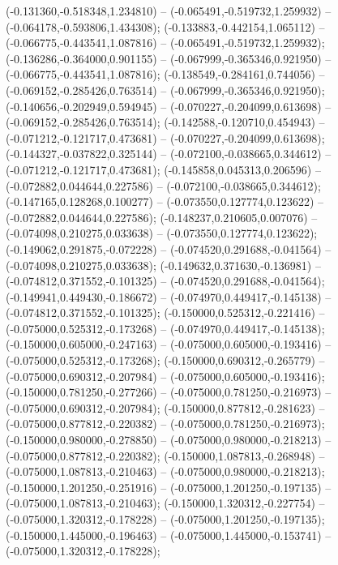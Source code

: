  (-0.131360,-0.518348,1.234810) -- (-0.065491,-0.519732,1.259932) -- (-0.064178,-0.593806,1.434308);
 (-0.133883,-0.442154,1.065112) -- (-0.066775,-0.443541,1.087816) -- (-0.065491,-0.519732,1.259932);
 (-0.136286,-0.364000,0.901155) -- (-0.067999,-0.365346,0.921950) -- (-0.066775,-0.443541,1.087816);
 (-0.138549,-0.284161,0.744056) -- (-0.069152,-0.285426,0.763514) -- (-0.067999,-0.365346,0.921950);
 (-0.140656,-0.202949,0.594945) -- (-0.070227,-0.204099,0.613698) -- (-0.069152,-0.285426,0.763514);
 (-0.142588,-0.120710,0.454943) -- (-0.071212,-0.121717,0.473681) -- (-0.070227,-0.204099,0.613698);
 (-0.144327,-0.037822,0.325144) -- (-0.072100,-0.038665,0.344612) -- (-0.071212,-0.121717,0.473681);
 (-0.145858,0.045313,0.206596) -- (-0.072882,0.044644,0.227586) -- (-0.072100,-0.038665,0.344612);
 (-0.147165,0.128268,0.100277) -- (-0.073550,0.127774,0.123622) -- (-0.072882,0.044644,0.227586);
 (-0.148237,0.210605,0.007076) -- (-0.074098,0.210275,0.033638) -- (-0.073550,0.127774,0.123622);
 (-0.149062,0.291875,-0.072228) -- (-0.074520,0.291688,-0.041564) -- (-0.074098,0.210275,0.033638);
 (-0.149632,0.371630,-0.136981) -- (-0.074812,0.371552,-0.101325) -- (-0.074520,0.291688,-0.041564);
 (-0.149941,0.449430,-0.186672) -- (-0.074970,0.449417,-0.145138) -- (-0.074812,0.371552,-0.101325);
 (-0.150000,0.525312,-0.221416) -- (-0.075000,0.525312,-0.173268) -- (-0.074970,0.449417,-0.145138);
 (-0.150000,0.605000,-0.247163) -- (-0.075000,0.605000,-0.193416) -- (-0.075000,0.525312,-0.173268);
 (-0.150000,0.690312,-0.265779) -- (-0.075000,0.690312,-0.207984) -- (-0.075000,0.605000,-0.193416);
 (-0.150000,0.781250,-0.277266) -- (-0.075000,0.781250,-0.216973) -- (-0.075000,0.690312,-0.207984);
 (-0.150000,0.877812,-0.281623) -- (-0.075000,0.877812,-0.220382) -- (-0.075000,0.781250,-0.216973);
 (-0.150000,0.980000,-0.278850) -- (-0.075000,0.980000,-0.218213) -- (-0.075000,0.877812,-0.220382);
 (-0.150000,1.087813,-0.268948) -- (-0.075000,1.087813,-0.210463) -- (-0.075000,0.980000,-0.218213);
 (-0.150000,1.201250,-0.251916) -- (-0.075000,1.201250,-0.197135) -- (-0.075000,1.087813,-0.210463);
 (-0.150000,1.320312,-0.227754) -- (-0.075000,1.320312,-0.178228) -- (-0.075000,1.201250,-0.197135);
 (-0.150000,1.445000,-0.196463) -- (-0.075000,1.445000,-0.153741) -- (-0.075000,1.320312,-0.178228);
